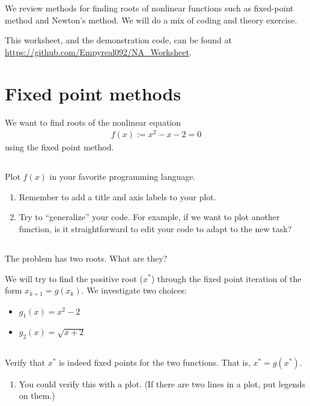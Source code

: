 \documentclass[11pt,letterpaper]{article}
\begin{document}
We review methods for finding roots of nonlinear functions such as fixed-point method and Newton's method. We will do a mix of coding and theory exercise. 

This worksheet, and the demonstration code, can be found at \url{https://github.com/Empyreal092/NA_Worksheet}.


\section{Fixed point methods}
We want to find roots of the nonlinear equation
\begin{align*}
    f(x) := x^2-x-2 = 0
\end{align*}
using the fixed point method.

\subsection{}
Plot $f(x)$ in your favorite programming language. 
\begin{enumerate}
    \item Remember to add a title and axis labels to your plot.
    \item Try to ``generalize'' your code. For example, if we want to plot another function, is it straightforward to edit your code to adapt to the new task?
\end{enumerate}


\subsection{}
The problem has two roots. What are they? 

\vspace{1cm}
We will try to find the positive root ($x^*$) through the fixed point iteration of the form $x_{k+1} = g(x_k)$. We investigate two choices:
\begin{itemize}
    \item $g_1(x) = x^2-2$
    \item $g_2(x) = \sqrt{x+2}$
\end{itemize}

\subsection{}\label{sec:1c}
Verify that $x^*$ is indeed fixed points for the two functions. That is, $x^* = g(x^*)$. 
\begin{enumerate}
    \item You could verify this with a plot. (If there are two lines in a plot, put legends on them.)
\end{enumerate}
\end{document}
